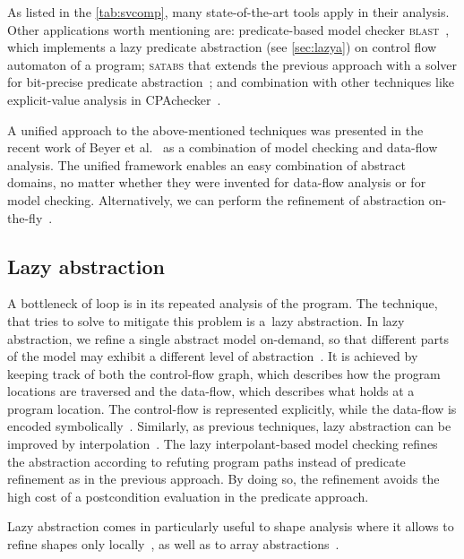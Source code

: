As listed in the \autoref{tab:svcomp}, many state-of-the-art tools apply \cegar
in their analysis. Other applications worth mentioning are: predicate-based
model checker \textsc{blast}~\cite{Henzinger2003, Beyer2005checking}, which
implements a lazy predicate abstraction (see \autoref{sec:lazya}) on control
flow automaton of a program; \textsc{satabs} that extends the previous approach
with a \sat solver for bit-precise predicate
abstraction~\cite{Clarke2005satabs}; and combination with other techniques like
explicit-value analysis in CPAchecker~\cite{Beyer2013, Beyer2018e}.

A unified approach to the above-mentioned techniques was presented in the recent
work of Beyer et al.~\cite{Beyer2018b} as a combination of model checking and
data-flow analysis. The unified framework enables an easy combination of
abstract domains, no matter whether they were invented for data-flow analysis
or for model checking. Alternatively, we can perform the refinement of abstraction
on-the-fly~\cite{Beyer2008program}.

\subsection{Lazy abstraction}
\label{sec:lazya}

A bottleneck of \cegar loop is in its repeated analysis of the program.  The
technique, that tries to solve to mitigate this problem is a~lazy abstraction.
In lazy abstraction, we refine a single abstract model on-demand, so that
different parts of the model may exhibit a different level of
abstraction~\cite{Henzinger2002}.  It is achieved by keeping track of both the
control-flow graph, which describes how the program locations are traversed and
the data-flow, which describes what holds at a program location. The
control-flow is represented explicitly, while the data-flow is encoded
symbolically~\cite{Alberti2012}.  Similarly, as previous techniques, lazy
abstraction can be improved by interpolation~\cite{McMillan2006}. The lazy
interpolant-based model checking refines the abstraction according to refuting
program paths instead of predicate refinement as in the previous approach. By
doing so, the refinement avoids the high cost of a postcondition evaluation in
the predicate approach.

Lazy abstraction comes in particularly useful to shape analysis where it allows
to refine shapes only locally~\cite{Henzinger2003,Beyer2006a}, as well as to
array abstractions~\cite{Alberti2012, Alberti2012b}.

